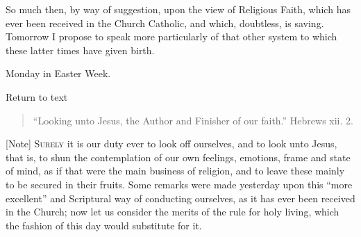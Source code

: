 So much then, by way of suggestion, upon the view of Religious Faith,
which has ever been received in the Church Catholic, and which,
doubtless, is saving. Tomorrow I propose to speak more particularly of
that other system to which these latter times have given birth.


Monday in Easter Week.

Return to text


\begin{quote}

``Looking unto Jesus, the Author and Finisher of our
faith.'' Hebrews xii. 2.

\end{quote}

[Note] S\textsc{urely} it is our duty ever
to look off ourselves, and to look unto Jesus, that is, to shun the
contemplation of our own feelings, emotions, frame and state of mind, as
if that were the main business of religion, and to leave these mainly to
be secured in their fruits. Some remarks were made yesterday upon this
``more excellent'' and Scriptural way of conducting ourselves,
as it has ever been received in the Church; now let us consider the
merits of the rule for holy living, which the fashion of this day would
substitute for it.

